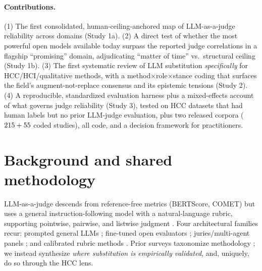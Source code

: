 \paragraph{Contributions.} (1) The first consolidated, human-ceiling-anchored map of LLM-as-a-judge reliability
across \Ndomains{} domains (Study 1a). (2) A direct test of whether the most powerful open models available today
surpass the reported judge correlations in a flagship ``promising'' domain, adjudicating ``matter of time'' vs.\
structural ceiling (Study 1b). (3) The first systematic review of LLM substitution \emph{specifically} for
HCC/HCI/qualitative methods, with a method$\times$role$\times$stance coding that surfaces the field's
augment-not-replace consensus and its epistemic tensions (Study 2). (4) A reproducible, standardized evaluation
harness plus a mixed-effects account of what governs judge reliability (Study 3), tested on HCC datasets that had
human labels but no prior LLM-judge evaluation, plus two released corpora ($215+55$ coded studies), all
code, and a decision framework for practitioners.

\section{Background and shared methodology}
LLM-as-a-judge descends from reference-free metrics (BERTScore, COMET) but uses a general instruction-following
model with a natural-language rubric, supporting pointwise, pairwise, and listwise judgment
\citep{li2024compsurvey,gu2024survey}. Four architectural families recur: prompted general LLMs
\citep{zheng2023mtbench,liu2023geval}; fine-tuned open evaluators \citep{kim2023prometheus,zhu2023judgelm,
wang2023pandalm}; juries/multi-agent panels \citep{verga2024poll,chan2023chateval}; and calibrated rubric methods
\citep{hashemi2024llmrubric}. Prior surveys taxonomize methodology \citep{gu2024survey,li2024gen2judge}; we instead
synthesize \emph{where substitution is empirically validated}, and, uniquely, do so through the HCC lens.

